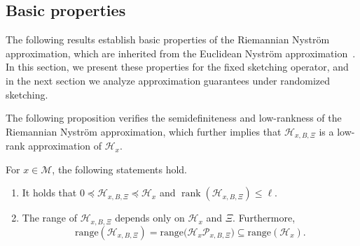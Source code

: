 \documentclass[final,onefignum,onetabnum]{siamart250211}
\begin{document}
\subsection{Basic properties}
The following results establish basic properties of the Riemannian Nystr\"om approximation, which are inherited from the Euclidean Nystr\"om approximation~\cite{martinsson2020randomized}. In this section, we present these properties for the fixed sketching operator, and in the next section we analyze approximation guarantees under randomized sketching.

The following proposition verifies the semidefiniteness and low-rankness of the Riemannian Nystr\"om approximation, which further implies that $\mathcal{H}_{x, B, \Xi}$ is a low-rank approximation of $\mathcal{H}_x$.
\begin{proposition}
  \label{lem:riem-21}
  For $x\in\mathcal M$, the following statements hold.
\begin{enumerate}
\item[\textup{(i)}] It holds that $0 \preceq \mathcal{H}_{x, B, \Xi} \preceq \mathcal{H}_x$ and $\operatorname{rank}(\mathcal{H}_{x, B, \Xi})\le \ell$.

\item[\textup{(ii)}] The range of $\mathcal{H}_{x, B, \Xi}$ depends only on $\mathcal{H}_x$ and $\Xi$. Furthermore,
  \[
  \mathrm{range}(\mathcal{H}_{x, B, \Xi})=\mathrm{range}\big(\mathcal{H}_x\mathcal{P}_{x, B, \Xi}\big)\subseteq \mathrm{range}(\mathcal{H}_x).
  \]
\end{enumerate}
  \end{proposition}
\end{document}
